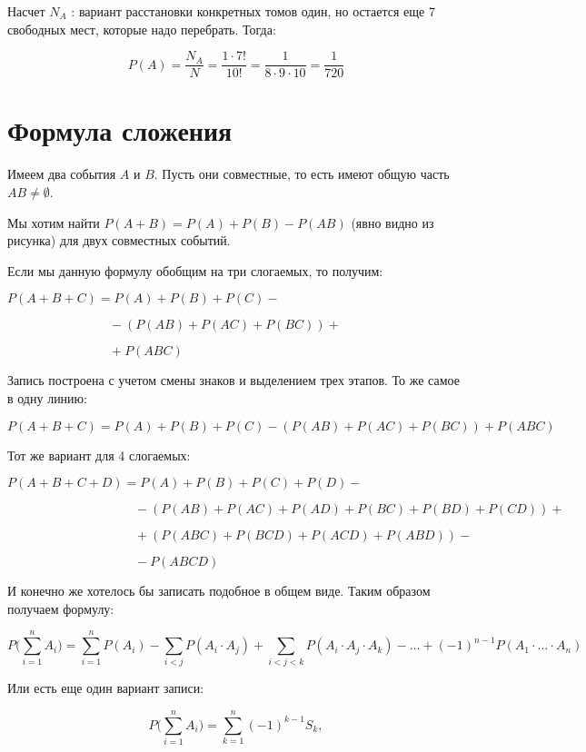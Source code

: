 \documentclass{article}
\begin{document}
Насчет $N_A$ : вариант расстановки конкретных томов один, но остается еще 7 свободных мест, которые надо перебрать. Тогда:

$$P(A) = \frac{N_A}{N} = \frac{1 \cdot 7!}{10!} = \frac{1}{8 \cdot 9 \cdot 10} = \frac{1}{720} $$

\section{Формула сложения}

Имеем два события $A$ и $B$. Пусть они совместные, то есть имеют общую часть $AB \not = \emptyset$.

Мы хотим найти $P(A + B) = P(A) + P(B) - P(AB)$ (явно видно из рисунка) для двух совместных событий.

\quad

Если мы данную формулу обобщим на три слогаемых, то получим:

$P(A + B + C) = P(A) + P(B) + P(C) - $

$\qquad\qquad\qquad\qquad- (P(AB) + P(AC) + P(BC)) + $

$\qquad\qquad\qquad\qquad+ P(ABC) $

Запись построена с учетом смены знаков и выделением трех этапов. То же самое в одну линию:

$$P(A + B + C) = P(A) + P(B) + P(C) - (P(AB) + P(AC) + P(BC)) + P(ABC) $$

\quad

Тот же вариант для 4 слогаемых:

$P(A + B + C + D) = P(A) + P(B) + P(C) + P(D) -$

$\qquad\qquad\qquad\qquad\qquad- (P(AB) + P(AC) + P(AD) + P(BC) + P(BD) + P(CD)) + $

$\qquad\qquad\qquad\qquad\qquad+ (P(ABC) + P(BCD) + P(ACD) + P(ABD)) -$

$\qquad\qquad\qquad\qquad\qquad- P(ABCD) $

\quad

И конечно же хотелось бы записать подобное в общем виде. Таким образом получаем формулу:

$$P\Biggl(\sum\limits_{i = 1}^n A_i\Biggr) = \sum\limits_{i = 1}^n P(A_i) - \sum\limits_{i < j} P(A_i \cdot A_j) + \sum\limits_{i < j < k} P(A_i \cdot A_j \cdot A_k) - \ldots + (-1)^{n - 1} P(A_1 \cdot \ldots \cdot A_n)$$

Или есть еще один вариант записи:

$$P\Biggl(\sum\limits_{i = 1}^n A_i\Biggr) = \sum\limits_{k = 1}^n (-1)^{k - 1} S_k,$$
\end{document}
